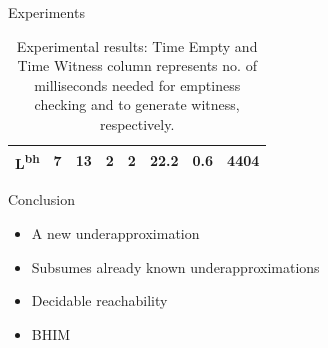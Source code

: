 \documentclass{beamer}
\begin{document}
\begin{frame}{Experiments}
\begin{table}[t]
{\begin{tabular}{c| c| c| c| c| c| c|c }
       L\textsuperscript{bh} & 7 & 13 & 2 &2  & 22.2&0.6 &4404 \\
       
       
       \hline
      
       
       
       \bottomrule
     \end{tabular}
   }
   \caption{\scriptsize Experimental results: Time Empty and Time Witness column
     represents no. of milliseconds needed for emptiness checking and
     to generate witness, respectively. }\label{tbl:experiment}
 \end{table}
    
\begin{table}[t]
  \centering {}

  \caption{\scriptsize Experimental results of timed examples. The column \cmax{}
    is defined as the maximum constant in the automaton, and Aged
    denotes if the stack is timed or not}\label{tbl:experimentTimed}
\end{table}

    \end{frame}
   \begin{frame}{Conclusion}
   \begin{itemize}[<+->]
   \item A new underapproximation
   \item Subsumes already known underapproximations
   \item Decidable reachability
   \item BHIM
   \end{itemize}
   \end{frame}
\end{document}
